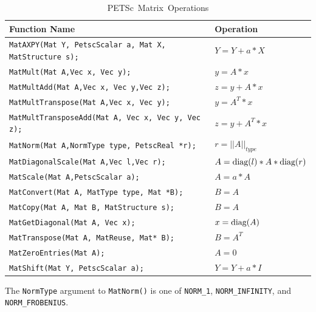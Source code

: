 \begin{table}[tb]
\begin{center}
\begin{tabular}{ll}
{\bf Function Name} & {\bf Operation} \\
\hline
\lstinline|MatAXPY(Mat Y, PetscScalar a, Mat X, MatStructure s);| & $ Y = Y + a*X $ \\
\lstinline|MatMult(Mat A,Vec x, Vec y);| & $ y = A*x $ \\
\lstinline|MatMultAdd(Mat A,Vec x, Vec y,Vec z);| & $ z = y + A*x $ \\
\lstinline|MatMultTranspose(Mat A,Vec x, Vec y);| & $ y = A^{T}*x $ \\
\lstinline|MatMultTransposeAdd(Mat A, Vec x, Vec y, Vec z);| & $ z = y + A^{T}*x $ \\
\lstinline|MatNorm(Mat A,NormType type, PetscReal *r);| & $ r = ||A||_{type}$ \\
\lstinline|MatDiagonalScale(Mat A,Vec l,Vec r);| & $ A = \hbox{diag}(l)*A*\hbox{diag}(r) $ \\
\lstinline|MatScale(Mat A,PetscScalar a);| & $ A = a*A $ \\
\lstinline|MatConvert(Mat A, MatType type, Mat *B);| & $ B = A $ \\
\lstinline|MatCopy(Mat A, Mat B, MatStructure s);| &  $ B = A $ \\
\lstinline|MatGetDiagonal(Mat A, Vec x);| & $ x = \hbox{diag}(A)$ \\
\lstinline|MatTranspose(Mat A, MatReuse, Mat* B);| & $ B = A^{T} $ \\
\lstinline|MatZeroEntries(Mat A);| & $ A = 0 $ \\
\lstinline|MatShift(Mat Y, PetscScalar a);| & $ Y =  Y + a*I $ \\
\hline
\end{tabular}
\end{center}
\caption{\hbox{PETSc Matrix Operations}}
\label{fig_matrixops}
\end{table}
The \lstinline{NormType} argument to \lstinline{MatNorm()} is one of
\lstinline{NORM_1}, \lstinline{NORM_INFINITY}, and \lstinline{NORM_FROBENIUS}.

  
